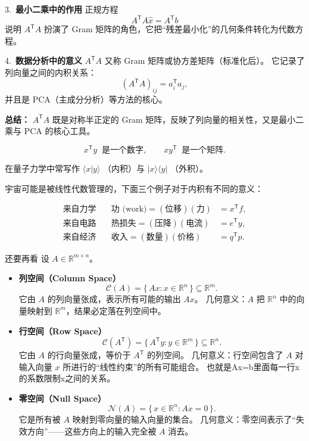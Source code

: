 \medskip

3.~\textbf{最小二乘中的作用}  
正规方程
\[
A^{\mathsf T}A \hat{x} = A^{\mathsf T}b
\]
说明 $A^{\mathsf T}A$ 扮演了 Gram 矩阵的角色，它把“残差最小化”的几何条件转化为代数方程。

\medskip

4.~\textbf{数据分析中的意义}  
$A^{\mathsf T}A$ 又称 Gram 矩阵或协方差矩阵（标准化后）。  
它记录了列向量之间的内积关系：
\[
(A^{\mathsf T}A)_{ij} = a_i^{\mathsf T}a_j,
\]
并且是 PCA（主成分分析）等方法的核心。

\medskip

\textbf{总结：} $A^{\mathsf T}A$ 既是对称半正定的 Gram 矩阵，反映了列向量的相关性，又是最小二乘与 PCA 的核心工具。
\begin{theorem}[转置与内积的意义]
    \[
x^{\mathsf T}y \;\; \text{是一个数字}, 
\qquad 
xy^{\mathsf T} \;\; \text{是一个矩阵}.
\]

在量子力学中常写作 $\langle x|y \rangle$ （内积）与 $|x\rangle \langle y|$ （外积）。

\medskip
宇宙可能是被线性代数管理的，下面三个例子对于内积有不同的意义：

\[
\begin{array}{lll}
\text{来自力学} & \quad \text{功 (work)} = (\text{位移})(\text{力}) &= x^{\mathsf T} f, \\[6pt]
\text{来自电路} & \quad \text{热损失} = (\text{压降})(\text{电流}) &= e^{\mathsf T} y, \\[6pt]
\text{来自经济} & \quad \text{收入} = (\text{数量})(\text{价格}) &= q^{\mathsf T} p.
\end{array}
\]
\end{theorem}
\begin{definition}
还要再看
设 $A \in \mathbb{R}^{m\times n}$。

\begin{itemize}
  \item \textbf{列空间（Column Space）}  
  \[
  \mathcal{C}(A) = \{\, A x : x \in \mathbb{R}^n \,\} \subseteq \mathbb{R}^m.
  \]  
  它由 $A$ 的列向量张成，表示所有可能的输出 $Ax$。  
  几何意义：$A$ 把 $\mathbb{R}^n$ 中的向量映射到 $\mathbb{R}^m$，结果必定落在列空间中。  

  \item \textbf{行空间（Row Space）}  
  \[
  \mathcal{C}(A^{\mathsf T}) = \{\, A^{\mathsf T} y : y \in \mathbb{R}^m \,\} \subseteq \mathbb{R}^n.
  \]  
  它由 $A$ 的行向量张成，等价于 $A^{\mathsf T}$ 的列空间。  
  几何意义：行空间包含了 $A$ 对输入向量 $x$ 所进行的“线性约束”的所有可能组合。 也就是Ax=b里面每一行x的系数限制x之间的关系。 

  \item \textbf{零空间（Null Space）}  
  \[
  \mathcal{N}(A) = \{\, x \in \mathbb{R}^n : A x = 0 \,\}.
  \]  
  它是所有被 $A$ 映射到零向量的输入向量的集合。  
  几何意义：零空间表示了“失效方向”——这些方向上的输入完全被 $A$ 消去。
\end{itemize}
\end{definition}


